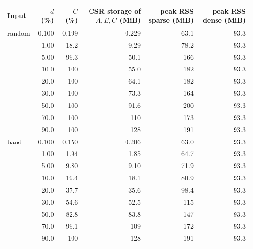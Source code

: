 \begin{tabular}{lrrrrr}
\toprule
Input & $d$ (\%) & $C$ (\%) & CSR storage of $A,B,C$ (MiB) & peak RSS sparse (MiB) & peak RSS dense (MiB) \\
\midrule
random & 0.100 & 0.199 & 0.229 & 63.1 & 93.3 \\
 & 1.00 & 18.2 & 9.29 & 78.2 & 93.3 \\
 & 5.00 & 99.3 & 50.1 & 166 & 93.3 \\
 & 10.0 & 100 & 55.0 & 182 & 93.3 \\
 & 20.0 & 100 & 64.1 & 182 & 93.3 \\
 & 30.0 & 100 & 73.3 & 164 & 93.3 \\
 & 50.0 & 100 & 91.6 & 200 & 93.3 \\
 & 70.0 & 100 & 110 & 173 & 93.3 \\
 & 90.0 & 100 & 128 & 191 & 93.3 \\
\midrule
band & 0.100 & 0.150 & 0.206 & 63.0 & 93.3 \\
 & 1.00 & 1.94 & 1.85 & 64.7 & 93.3 \\
 & 5.00 & 9.80 & 9.10 & 71.9 & 93.3 \\
 & 10.0 & 19.4 & 18.1 & 80.9 & 93.3 \\
 & 20.0 & 37.7 & 35.6 & 98.4 & 93.3 \\
 & 30.0 & 54.6 & 52.5 & 115 & 93.3 \\
 & 50.0 & 82.8 & 83.8 & 147 & 93.3 \\
 & 70.0 & 99.1 & 109 & 172 & 93.3 \\
 & 90.0 & 100 & 128 & 191 & 93.3 \\
\bottomrule
\end{tabular}
